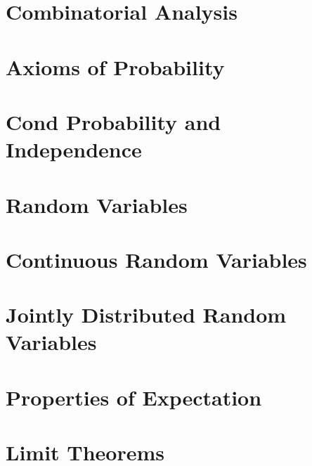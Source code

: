 \documentclass[10pt]{article}
\begin{document}
\begin{multicols*}{3}
\section{Combinatorial Analysis}


\section{Axioms of Probability}


\section{Cond Probability and Independence}


\section{Random Variables}


\section{Continuous Random Variables}


\section{Jointly Distributed Random Variables}


\section{Properties of Expectation}


\section{Limit Theorems}


\end{multicols*}
\end{document}
